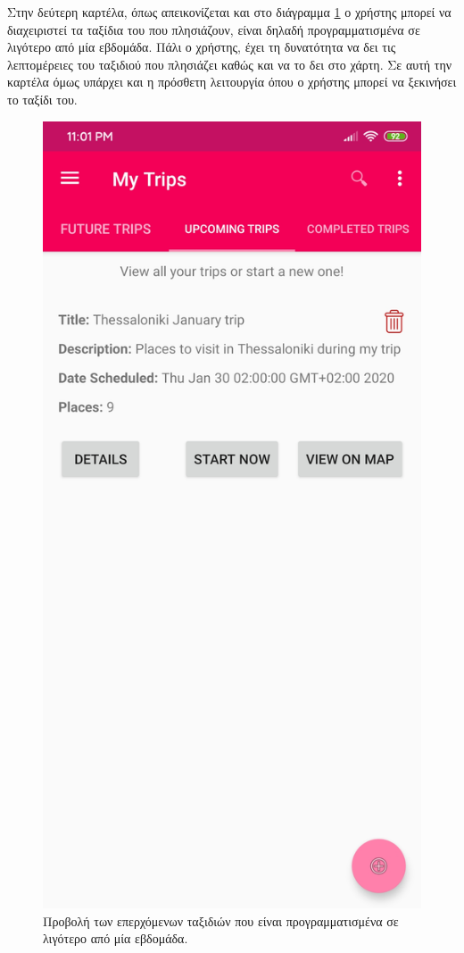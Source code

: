 \documentclass[oneside, 12pt]{book}
\begin{document}
Στην δεύτερη καρτέλα, όπως απεικονίζεται και στο διάγραμμα \ref{fig:upcoming_trips} ο χρήστης μπορεί να διαχειριστεί τα ταξίδια του που πλησιάζουν, είναι δηλαδή προγραμματισμένα σε λιγότερο από μία εβδομάδα. Πάλι ο χρήστης, έχει τη δυνατότητα να δει τις λεπτομέρειες του ταξιδιού που πλησιάζει καθώς και να το δει στο χάρτη.
Σε αυτή την καρτέλα όμως υπάρχει και η πρόσθετη λειτουργία όπου ο χρήστης μπορεί να ξεκινήσει το ταξίδι του.
\begin{figure}[h]
  \centering
  \includegraphics[scale=0.15]{images/upcoming_trips.jpg}
  \caption{\label{fig:upcoming_trips}Προβολή των επερχόμενων ταξιδιών που είναι προγραμματισμένα σε λιγότερο από μία εβδομάδα.}
\end{figure}
\end{document}
